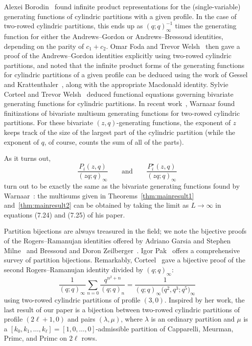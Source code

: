 \documentclass[10pt,a4paper]{amsart}
\numberwithin{equation}{section}
\theoremstyle{definition}
\begin{document}
Alexei Borodin~\cite{Bor} found infinite product representations for the (single-variable) generating functions of cylindric partitions with a given profile. In the case of two-rowed cylindric partitions, this ends up as $(q;q)^{-1}_\infty$ times the generating function for either the Andrews--Gordon or Andrews--Bressoud identities, depending on the parity of $c_1+c_2$. Omar Foda and Trevor Welsh~\cite{FodWel} then gave a proof of the Andrews--Gordon identities explicitly using two-rowed cylindric partitions, and noted that the infinite product forms of the generating functions for cylindric partitions of a given profile can be deduced using the work of Gessel and Krattenthaler~\cite{GesKra}, along with the appropriate Macdonald identity. Sylvie Corteel and Trevor Welsh~\cite{CW} deduced functional equations governing bivariate generating functions for cylindric partitions. In recent work~\cite{WarnCyl}, Warnaar found finitizations of bivariate multisum generating functions for two-rowed cylindric partitions. For these bivariate $(z,q)$-generating functions, the exponent of $z$ keeps track of the size of the largest part of the cylindric partition (while the exponent of $q$, of course, counts the sum of all of the parts).

As it turns out, \[ \frac{P_i(z,q)}{(zq;q)_\infty} \qquad \text{and} \qquad \displaystyle \frac{P_i^\star (z,q)}{(zq;q)_\infty}\] turn out to be exactly the same as the bivariate generating functions found by Warnaar~\cite{WarnCyl}: the multisums given in Theorems~\ref{thm:mainresult1} and~\ref{thm:mainresult2} can be obtained by taking the limit as $L\to \infty$ in equations (7.24) and (7.25) of his paper.

Partition bijections are always treasured in the field; we note the bijective proofs of the Rogers--Ramanujan identities offered by Adriano Garsia and Stephen Milne~\cite{GarMil} and Bressoud and Doron Zeilberger~\cite{BZ}. Igor Pak~\cite{PakSurvey} offers a comprehensive survey of partition bijections. Remarkably, Corteel~\cite{Cort} gave a bijective proof of the second Rogers--Ramanujan identity divided by $(q;q)_\infty$:
\begin{equation*}
\frac{1}{(q;q)_\infty}\sum_{n=0}\frac{q^{n^2+n}}{(q;q)_n} = \frac{1}{(q;q)_\infty\bigl(q^2,q^3;q^5\bigr)_\infty}
\end{equation*}
using two-rowed cylindric partitions of profile $(3,0)$. Inspired by her work, the last result of our paper is a bijection between two-rowed cylindric partitions of profile $(2\ell+1,0)$ and pairs $(\lambda,\mu)$, where $\lambda$ is an ordinary partition and $\mu$ is a $[k_0,k_1,\dots,k_\ell]=[1,0,\dots,0]$-admissible partition of Capparelli, Meurman, Primc, and Primc on $2\ell$ rows.
\end{document}
